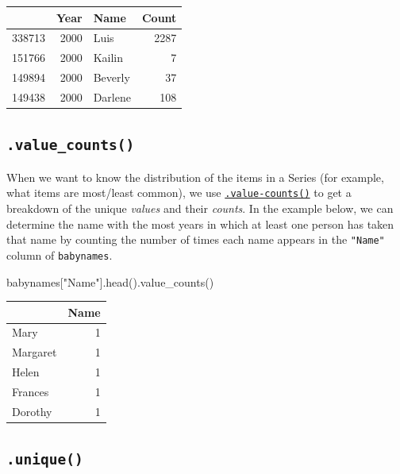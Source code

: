 \documentclass[
  letterpaper,
  DIV=11,
  numbers=noendperiod]{scrreprt}
\newenvironment{Shaded}{\begin{snugshade}}{\end{snugshade}}
\newcommand{\NormalTok}[1]{\textcolor[rgb]{0.00,0.23,0.31}{#1}}
\newcommand{\StringTok}[1]{\textcolor[rgb]{0.13,0.47,0.30}{#1}}
\begin{document}
\begin{tabular}{lrlr}
\toprule
{} &  Year &     Name &  Count \\
\midrule
338713 &  2000 &     Luis &   2287 \\
151766 &  2000 &   Kailin &      7 \\
149894 &  2000 &  Beverly &     37 \\
149438 &  2000 &  Darlene &    108 \\
\bottomrule
\end{tabular}

\hypertarget{value_counts}{%
\subsection{\texorpdfstring{\texttt{.value\_counts()}}{.value\_counts()}}\label{value_counts}}

When we want to know the distribution of the items in a Series (for
example, what items are most/least common), we use
\href{https://pandas.pydata.org/docs/reference/api/pandas.Series.value_counts.html}{\texttt{.value-counts()}}
to get a breakdown of the unique \emph{values} and their \emph{counts}.
In the example below, we can determine the name with the most years in
which at least one person has taken that name by counting the number of
times each name appears in the \texttt{"Name"} column of
\texttt{babynames}.

\begin{Shaded}
\begin{Highlighting}[]
\NormalTok{babynames[}\StringTok{"Name"}\NormalTok{].head().value\_counts()}
\end{Highlighting}
\end{Shaded}

\begin{tabular}{lr}
\toprule
{} &  Name \\
\midrule
Mary     &     1 \\
Margaret &     1 \\
Helen    &     1 \\
Frances  &     1 \\
Dorothy  &     1 \\
\bottomrule
\end{tabular}

\hypertarget{unique}{%
\subsection{\texorpdfstring{\texttt{.unique()}}{.unique()}}\label{unique}}
\end{document}
